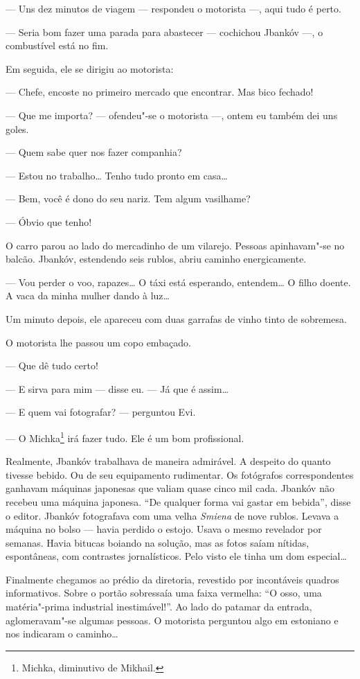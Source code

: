 --- Uns dez minutos de viagem --- respondeu o motorista
---, aqui tudo é perto.

--- Seria bom fazer uma parada para abastecer ---
cochichou Jbankóv ---, o combustível está no fim.

Em seguida, ele se dirigiu ao motorista:

--- Chefe, encoste no primeiro mercado que encontrar. Mas bico
fechado!

--- Que me importa? --- ofendeu"-se o motorista ---,
ontem eu também dei uns goles.

--- Quem sabe quer nos fazer companhia?

--- Estou no trabalho\ldots{} Tenho tudo pronto em casa\ldots{}

--- Bem, você é dono do seu nariz. Tem algum vasilhame?

--- Óbvio que tenho!

O carro parou ao lado do mercadinho de um vilarejo. Pessoas apinhavam"-se
no balcão. Jbankóv, estendendo seis rublos, abriu caminho energicamente.

--- Vou perder o voo, rapazes\ldots{} O táxi está esperando,
entendem\ldots{} O filho doente. A vaca da minha mulher dando à luz\ldots{}

Um minuto depois, ele apareceu com duas garrafas de vinho tinto de
sobremesa.

O motorista lhe passou um copo embaçado.

--- Que dê tudo certo!

--- E sirva para mim --- disse eu. --- Já que é
assim\ldots{}

--- E quem vai fotografar? --- perguntou Evi.

--- O Michka\footnote{Michka, diminutivo de Mikhail.} irá fazer
tudo. Ele é um bom profissional.

Realmente, Jbankóv trabalhava de maneira admirável. A despeito do quanto
tivesse bebido. Ou de seu equipamento rudimentar. Os fotógrafos
correspondentes ganhavam máquinas japonesas que valiam quase cinco mil
cada. Jbankóv não recebeu uma máquina japonesa. ``De qualquer forma vai
gastar em bebida'', disse o editor. Jbankóv fotografava com uma velha
\emph{Smiena} de nove rublos. Levava a máquina no bolso --- havia
perdido o estojo. Usava o mesmo revelador por semanas. Havia bitucas
boiando na solução, mas as fotos saíam nítidas, espontâneas, com
contrastes jornalísticos. Pelo visto ele tinha um dom especial\ldots{}

Finalmente chegamos ao prédio da diretoria, revestido por incontáveis
quadros informativos. Sobre o portão sobressaía uma faixa vermelha: ``O
osso, uma matéria"-prima industrial inestimável!''. Ao lado do patamar da
entrada, aglomeravam"-se algumas pessoas. O motorista perguntou algo em
estoniano e nos indicaram o caminho\ldots{}

